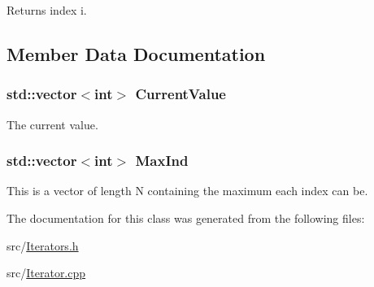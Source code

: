 Returns index i. 

\subsection{Member Data Documentation}
\hypertarget{classJKBuilder_1_1Iterator_a20ca24f6d827aba144bb087c4bcb74a0}{
\subsubsection[{CurrentValue}]{\setlength{\rightskip}{0pt plus 5cm}std::vector$<$int$>$ {\bf CurrentValue}}}
\label{classJKBuilder_1_1Iterator_a20ca24f6d827aba144bb087c4bcb74a0}


The current value. \hypertarget{classJKBuilder_1_1Iterator_ab6b56d3c4e9353bc938dd6249cde9ca0}{
\subsubsection[{MaxInd}]{\setlength{\rightskip}{0pt plus 5cm}std::vector$<$int$>$ {\bf MaxInd}}}
\label{classJKBuilder_1_1Iterator_ab6b56d3c4e9353bc938dd6249cde9ca0}


This is a vector of length N containing the maximum each index can be. 

The documentation for this class was generated from the following files:\begin{DoxyCompactItemize}
\item 
src/\hyperlink{Iterators_8h}{Iterators.h}\item 
src/\hyperlink{Iterator_8cpp}{Iterator.cpp}\end{DoxyCompactItemize}
